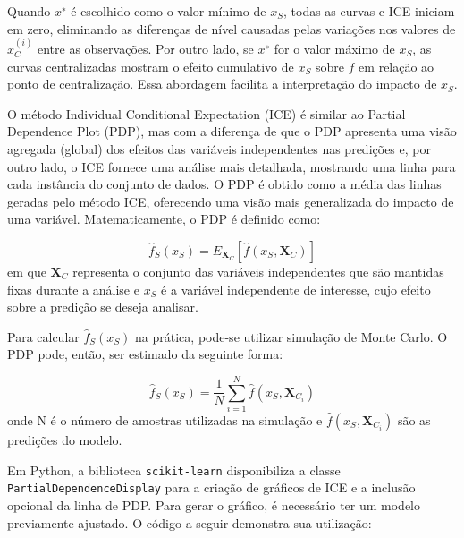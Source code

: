\documentclass[
  12pt,
  a4paper,
]{scrreprt}
\begin{document}
\vspace{12pt}

Quando \(x^∗\) é escolhido como o valor mínimo de \(x_S\), todas as
curvas c-ICE iniciam em zero, eliminando as diferenças de nível causadas
pelas variações nos valores de \(x_C^{\left(i\right)}\)\hspace{0pt}
entre as observações. Por outro lado, se \(x^∗\) for o valor máximo de
\(x_S\), as curvas centralizadas mostram o efeito cumulativo de
\(x_S\)\hspace{0pt} sobre \(\hat f\)\hspace{0pt} em relação ao ponto de
centralização. Essa abordagem facilita a interpretação do impacto de
\(x_S\).

\vspace{12pt}

O método Individual Conditional Expectation (ICE) é similar ao Partial
Dependence Plot (PDP), mas com a diferença de que o PDP apresenta uma
visão agregada (global) dos efeitos das variáveis independentes nas
predições e, por outro lado, o ICE fornece uma análise mais detalhada,
mostrando uma linha para cada instância do conjunto de dados. O PDP é
obtido como a média das linhas geradas pelo método ICE, oferecendo uma
visão mais generalizada do impacto de uma variável. Matematicamente, o
PDP é definido como:

\[
\hat{f}_{S}\left(x_{S}\right) = E_{\mathbf{X}_{C}}\left[\hat{f}\left(x_{S}, \mathbf{X}_{C}\right)\right]
\] em que \(\mathbf{X}_C\) representa o conjunto das variáveis
independentes que são mantidas fixas durante a análise e \(x_S\) é a
variável independente de interesse, cujo efeito sobre a predição se
deseja analisar.

\vspace{12pt}

Para calcular \(\hat{f}_S\left(x_S\right)\) na prática, pode-se utilizar
simulação de Monte Carlo. O PDP pode, então, ser estimado da seguinte
forma:

\[
\hat{f}_S\left(x_S\right) = \frac{1}{N} \sum^{N}_{i=1}\hat{f}\left(x_{S}, \mathbf{X}_{C_i}\right)
\] onde N é o número de amostras utilizadas na simulação e
\(\hat{f}\left(x_{S}, \mathbf{X}_{C_i}\right)\) são as predições do
modelo.

\vspace{12pt}

Em Python, a biblioteca \texttt{scikit-learn} disponibiliza a classe
\texttt{PartialDependenceDisplay} para a criação de gráficos de ICE e a
inclusão opcional da linha de PDP. Para gerar o gráfico, é necessário
ter um modelo previamente ajustado. O código a seguir demonstra sua
utilização:
\end{document}
